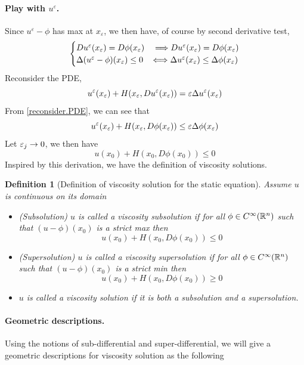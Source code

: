 \documentclass[12pt, oneside]{amsart}  	%
\newtheorem{definition}{Definition}
\begin{document}
\paragraph{\textbf{Play with $u^\varepsilon$.}} Since $u^\varepsilon -\phi$ has max at $x_\varepsilon$, we then have, of course by second derivative test,
\begin{equation}\label{reconsider.PDE}
\begin{cases}
	Du^\varepsilon(x_\varepsilon)=D\phi(x_\varepsilon) &\;\Longrightarrow Du^\varepsilon(x_\varepsilon) = D\phi(x_\varepsilon) \\
	\Delta(u^\varepsilon - \phi)(x_\varepsilon)\le 0 &\Longleftrightarrow \Delta u^\varepsilon(x_\varepsilon)\le \Delta\phi(x_\varepsilon)
\end{cases}
\end{equation}
Reconsider the PDE,
\begin{equation*}
u^\varepsilon(x_\varepsilon) + H(x_\varepsilon, Du^\varepsilon(x_\varepsilon))=\varepsilon \Delta u^\varepsilon(x_\varepsilon)
\end{equation*}
From \eqref{reconsider.PDE}, we can see that
\begin{equation*}
u^\varepsilon(x_\varepsilon) + H(x_\varepsilon, D\phi(x_\varepsilon))\le \varepsilon \Delta\phi(x_\varepsilon)
\end{equation*}
Let $\varepsilon_j\to 0$, we then have
\begin{equation*}
u(x_0)+ H(x_0, D\phi(x_0))\le 0
\end{equation*}
Inspired by this derivation, we have the definition of viscosity solutions.
	
\begin{definition} [Definition of viscosity solution for the static equation] Assume $u$ is continuous on its domain
\begin{itemize}
\item (Subsolution) $u$ is called a viscosity subsolution if for all $\phi\in C^\infty(\mathbb{R}^n)$ such that $(u-\phi)(x_0)$ is a strict max then 
$$u(x_0) + H(x_0, D\phi(x_0))\le 0$$
\item (Supersolution) $u$ is called a viscosity supersolution if for all $\phi\in C^\infty(\mathbb{R}^n)$ such that $(u-\phi)(x_0)$ is a strict min then 
$$u(x_0) + H(x_0, D\phi(x_0))\ge 0$$
\item $u$ is called a viscosity solution if it is both a subsolution and a supersolution.
\end{itemize}
\end{definition}

\paragraph{\textbf{Geometric descriptions.}} Using the notions of sub-differential and super-differential, we will give a geometric descriptions for viscosity solution as the following
\end{document}
